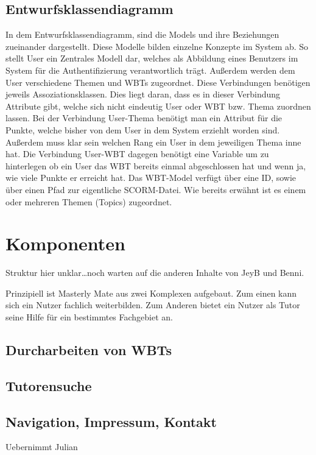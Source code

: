 \subsection{Entwurfsklassendiagramm}
In dem Entwurfsklassendiagramm, sind die Models und ihre Beziehungen zueinander
dargestellt. Diese Modelle bilden einzelne Konzepte im System ab. So stellt User
ein Zentrales Modell dar, welches als Abbildung eines Benutzers im System für
die Authentifizierung verantwortlich trägt. Außerdem werden dem User
verschiedene Themen und WBTs zugeordnet. Diese Verbindungen benötigen jeweils
Assoziationsklassen. Dies liegt daran, dass es in dieser Verbindung Attribute
gibt, welche sich nicht eindeutig User oder WBT bzw. Thema zuordnen lassen. Bei
der Verbindung User-Thema benötigt man ein Attribut für die Punkte, welche
bisher von dem User in dem System erziehlt worden sind. Außerdem muss klar sein
welchen Rang ein User in dem jeweiligen Thema inne hat. Die Verbindung User-WBT
dagegen benötigt eine Variable um zu hinterlegen ob ein User das WBT bereits
einmal abgeschlossen hat und wenn ja, wie viele Punkte er erreicht hat. Das
WBT-Model verfügt über eine ID, sowie über einen Pfad zur eigentliche
SCORM-Datei. Wie bereits erwähnt ist es einem oder mehreren Themen (Topics)
zugeordnet.\label{ref:objectWBT}

\section{Komponenten}
\begin{k}
Struktur hier unklar\ldots noch warten auf die anderen Inhalte von JeyB und
Benni.
\end{k}
Prinzipiell ist Masterly Mate aus zwei Komplexen aufgebaut. Zum einen kann sich
ein Nutzer fachlich weiterbilden. Zum Anderen bietet ein Nutzer als Tutor seine
Hilfe für ein bestimmtes Fachgebiet an.

\subsection{Durcharbeiten von WBTs}

\subsection{Tutorensuche}

\subsection{Navigation, Impressum, Kontakt}
\begin{k}
Uebernimmt Julian
\end{k}

